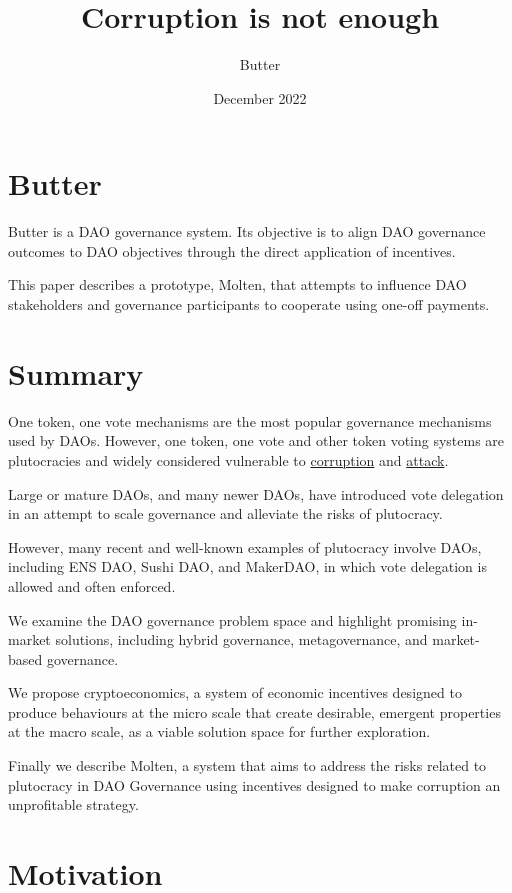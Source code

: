 \documentclass[
]{article}
\title{Corruption is not enough}
\author{Butter}
\date{December 2022}
\begin{document}
\maketitle
\setcounter{tocdepth}{2}
\tableofcontents

\hypertarget{butter}{%
\section{Butter}\label{butter}}

Butter is a DAO governance system. Its objective is to align DAO
governance outcomes to DAO objectives through the direct application of
incentives.

This paper describes a prototype, Molten, that attempts to influence DAO
stakeholders and governance participants to cooperate using one-off
payments.

\hypertarget{summary}{%
\section{Summary}\label{summary}}

One token, one vote mechanisms are the most popular governance
mechanisms used by DAOs. However, one token, one vote and other token
voting systems are plutocracies and widely considered vulnerable to
\href{./problems.md\#corruption-problems}{corruption} and
\href{./problems.md\#attack-problems}{attack}.

Large or mature DAOs, and many newer DAOs, have introduced vote
delegation in an attempt to scale governance and alleviate the risks of
plutocracy.

However, many recent and well-known examples of plutocracy involve DAOs,
including ENS DAO, Sushi DAO, and MakerDAO, in which vote delegation is
allowed and often enforced.

We examine the DAO governance problem space and highlight promising
in-market solutions, including hybrid governance, metagovernance, and
market-based governance.

We propose cryptoeconomics, a system of economic incentives designed to
produce behaviours at the micro scale that create desirable, emergent
properties at the macro scale, as a viable solution space for further
exploration.

Finally we describe Molten, a system that aims to address the risks
related to plutocracy in DAO Governance using incentives designed to
make corruption an unprofitable strategy.
\hypertarget{motivation}{%
\section{Motivation}\label{motivation}}
\end{document}

